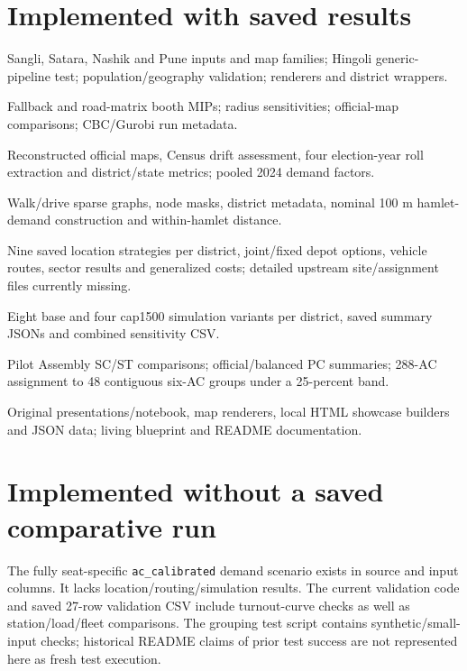 \documentclass[11pt,a4paper,oneside]{report}
\begin{document}
\section{Implemented with saved results}
\begin{description}[style=nextline]
\item[Districting and preparation] Sangli, Satara, Nashik and Pune inputs and map families; Hingoli generic-pipeline test; population/geography validation; renderers and district wrappers.
\item[Legacy station optimization] Fallback and road-matrix booth MIPs; radius sensitivities; official-map comparisons; CBC/Gurobi run metadata.
\item[Audit and calibration] Reconstructed official maps, Census drift assessment, four election-year roll extraction and district/state metrics; pooled 2024 demand factors.
\item[Networks and final demand] Walk/drive sparse graphs, node masks, district metadata, nominal 100 m hamlet-demand construction and within-hamlet distance.
\item[Strategic/operational logistics] Nine saved location strategies per district, joint/fixed depot options, vehicle routes, sector results and generalized costs; detailed upstream site/assignment files currently missing.
\item[Polling day] Eight base and four cap1500 simulation variants per district, saved summary JSONs and combined sensitivity CSV.
\item[Representation] Pilot Assembly SC/ST comparisons; official/balanced PC summaries; 288-AC assignment to 48 contiguous six-AC groups under a 25-percent band.
\item[Communication] Original presentations/notebook, map renderers, local HTML showcase builders and JSON data; living blueprint and README documentation.
\end{description}

\section{Implemented without a saved comparative run}
The fully seat-specific \texttt{ac\_calibrated} demand scenario exists in source and input columns. It lacks location/routing/simulation results. The current validation code and saved 27-row validation CSV include turnout-curve checks as well as station/load/fleet comparisons. The grouping test script contains synthetic/small-input checks; historical README claims of prior test success are not represented here as fresh test execution.
\end{document}
